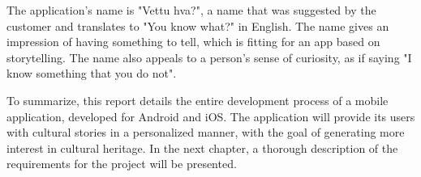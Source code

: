 The application's name is "Vettu hva?", a name that was suggested by the customer and translates to "You know what?" in English. The name gives an impression of having something to tell, which is fitting for an app based on storytelling. The name also appeals to a person's sense of curiosity, as if saying "I know something that you do not".\newline

To summarize, this report details the entire development process of a mobile application, developed for Android and iOS. The application will provide its users with cultural stories in a personalized manner, with the goal of generating more interest in cultural heritage. In the next chapter, a thorough description of the requirements for the project will be presented.

\cleardoublepage